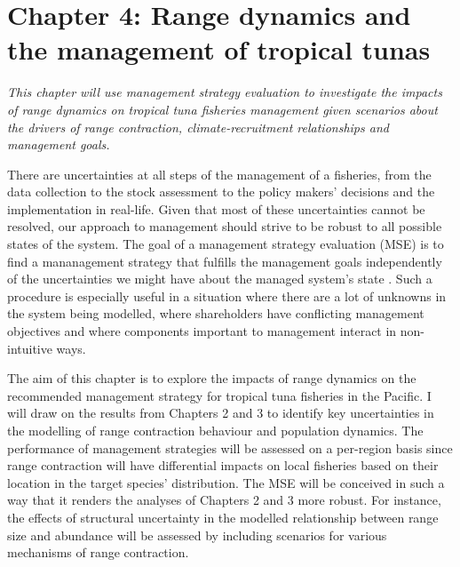 \documentclass{article}
\begin{document}

\newpage
\section*{Chapter 4: Range dynamics and the management of tropical tunas}
\addtocounter{section}{1}
\setcounter{subsection}{0}
\emph{This chapter will use management strategy evaluation
  to investigate the impacts of range dynamics on tropical tuna
  fisheries management given scenarios about the drivers of range
  contraction, climate-recruitment relationships and management goals.}

There are uncertainties at all steps of the management of a fisheries,
from the data collection to the stock assessment to the policy makers'
decisions and the implementation in real-life. Given that most of these
uncertainties cannot be resolved, our approach to
management should strive to be robust to all possible states of the
system. The goal of a management strategy evaluation (MSE) is to
find a mananagement strategy that fulfills the management goals
independently of the uncertainties we might have about the managed
system's state \citep{Punt2007_a}. Such a procedure is especially
useful in a situation where there are a lot of unknowns in the system
being modelled, where shareholders have conflicting management
objectives and  where components important to management
 interact in non-intuitive ways.

The aim of this chapter is to explore the impacts of range dynamics
on the recommended management strategy for tropical
tuna fisheries in the Pacific. I will draw on the results from
Chapters 2 and 3 to identify key uncertainties in the modelling of range
contraction behaviour and population dynamics. The
performance of management strategies will be assessed on a per-region
basis since range contraction will have differential impacts on local fisheries
based on their location in the target species' distribution. The MSE will be conceived in such a way that it
renders the analyses of Chapters 2 and 3
more robust. For instance, the effects of structural uncertainty in
the modelled relationship between range size and abundance will be
assessed by including scenarios for various mechanisms of range contraction.
\end{document}
